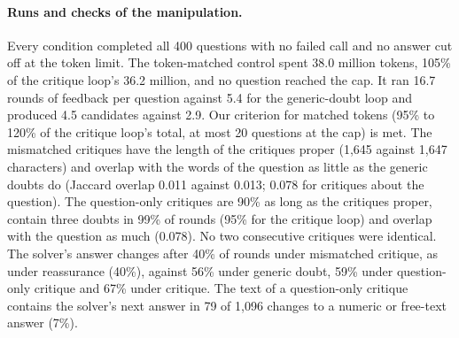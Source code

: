 \documentclass[11pt]{article}
\begin{document}
\paragraph{Runs and checks of the manipulation.}
Every condition completed all 400 questions with no failed call and no answer cut off at the token limit.
The token-matched control spent 38.0 million tokens, 105\% of the critique loop's 36.2 million, and no question reached the cap. It ran 16.7 rounds of feedback per question against 5.4 for the generic-doubt loop and produced 4.5 candidates against 2.9.
Our criterion for matched tokens (95\% to 120\% of the critique loop's total, at most 20 questions at the cap) is met.
The mismatched critiques have the length of the critiques proper (1{,}645 against 1{,}647 characters) and overlap with the words of the question as little as the generic doubts do (Jaccard overlap 0.011 against 0.013; 0.078 for critiques about the question).
The question-only critiques are 90\% as long as the critiques proper, contain three doubts in 99\% of rounds (95\% for the critique loop) and overlap with the question as much (0.078). No two consecutive critiques were identical.
The solver's answer changes after 40\% of rounds under mismatched critique, as under reassurance (40\%), against 56\% under generic doubt, 59\% under question-only critique and 67\% under critique.
The text of a question-only critique contains the solver's next answer in 79 of 1{,}096 changes to a numeric or free-text answer (7\%).
\end{document}
